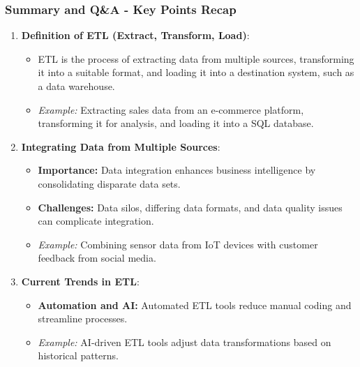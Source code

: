 \documentclass[aspectratio=169]{beamer}
\begin{document}
\begin{frame}[fragile]
    \frametitle{Summary and Q\&A - Key Points Recap}
    
    \begin{enumerate}
        \item \textbf{Definition of ETL (Extract, Transform, Load)}:
        \begin{itemize}
            \item ETL is the process of extracting data from multiple sources, transforming it into a suitable format, and loading it into a destination system, such as a data warehouse.
            \item \textit{Example:} Extracting sales data from an e-commerce platform, transforming it for analysis, and loading it into a SQL database.
        \end{itemize}

        \item \textbf{Integrating Data from Multiple Sources}:
        \begin{itemize}
            \item \textbf{Importance:} Data integration enhances business intelligence by consolidating disparate data sets.
            \item \textbf{Challenges:} Data silos, differing data formats, and data quality issues can complicate integration.
            \item \textit{Example:} Combining sensor data from IoT devices with customer feedback from social media.
        \end{itemize}

        \item \textbf{Current Trends in ETL}:
        \begin{itemize}
            \item \textbf{Automation and AI:} Automated ETL tools reduce manual coding and streamline processes.
            \item \textit{Example:} AI-driven ETL tools adjust data transformations based on historical patterns.
        \end{itemize}
    \end{enumerate}
\end{frame}
\end{document}
